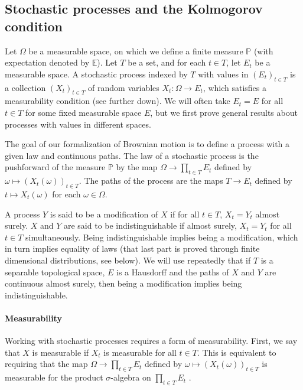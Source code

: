 \documentclass[lean]{Draft}
\begin{document}
\subsection{Stochastic processes and the Kolmogorov condition}

Let $\Omega$ be a measurable space, on which we define a finite measure $\mathbb{P}$ (with expectation denoted by $\mathbb{E}$).
Let $T$ be a set, and for each $t \in T$, let $E_t$ be a measurable space.
A stochastic process indexed by $T$ with values in $(E_t)_{t \in T}$ is a collection $(X_t)_{t \in T}$ of random variables $X_t : \Omega \to E_t$, which satisfies a measurability condition (see further down).
We will often take $E_t = E$ for all $t \in T$ for some fixed measurable space $E$, but we first prove general results about processes with values in different spaces.

The goal of our formalization of Brownian motion is to define a process with a given law and continuous paths.
The law of a stochastic process is the pushforward of the measure $\mathbb{P}$ by the map $\Omega \to \prod_{t \in T} E_t$ defined by $\omega \mapsto (X_t(\omega))_{t \in T}$.
The paths of the process are the maps $T \to E_t$ defined by $t \mapsto X_t(\omega)$ for each $\omega \in \Omega$.

A process $Y$ is said to be a modification of $X$ if for all $t \in T$, $X_t = Y_t$ almost surely.
$X$ and $Y$ are said to be indistinguishable if almost surely, $X_t = Y_t$ for all $t \in T$ simultaneously.
Being indistinguishable implies being a modification, which in turn implies equality of laws (that last part is proved through finite dimensional distributions, see below).
We will use repeatedly that if $T$ is a separable topological space, $E$ is a Hausdorff and the paths of $X$ and $Y$ are continuous almost surely, then being a modification implies being indistinguishable.


\paragraph{Measurability}

Working with stochastic processes requires a form of measurability.
First, we say that $X$ is measurable if $X_t$ is measurable for all $t \in T$.
This is equivalent to requiring that the map $\Omega \to \prod_{t \in T} E_t$ defined by $\omega \mapsto (X_t(\omega))_{t \in T}$ is measurable for the product $\sigma$-algebra on $\prod_{t \in T} E_t$ .
\end{document}
